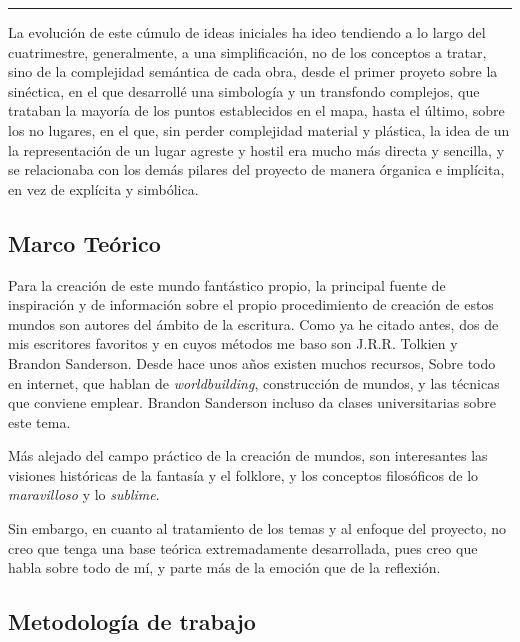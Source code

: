 \documentclass[twoside,twocolumn]{article}
\begin{document}
\begin{center}\rule{0.5\linewidth}{0.5pt}\end{center}

La evolución de este cúmulo de ideas iniciales ha ideo tendiendo a lo
largo del cuatrimestre, generalmente, a una simplificación, no de los
conceptos a tratar, sino de la complejidad semántica de cada obra, desde
el primer proyeto sobre la sinéctica, en el que desarrollé una
simbología y un transfondo complejos, que trataban la mayoría de los
puntos establecidos en el mapa, hasta el último, sobre los no lugares,
en el que, sin perder complejidad material y plástica, la idea de un la
representación de un lugar agreste y hostil era mucho más directa y
sencilla, y se relacionaba con los demás pilares del proyecto de manera
órganica e implícita, en vez de explícita y simbólica.

\hypertarget{marco-teuxf3rico}{%
\subsection{Marco Teórico}\label{marco-teuxf3rico}}

Para la creación de este mundo fantástico propio, la principal fuente de
inspiración y de información sobre el propio procedimiento de creación
de estos mundos son autores del ámbito de la escritura. Como ya he
citado antes, dos de mis escritores favoritos y en cuyos métodos me baso
son J.R.R. Tolkien y Brandon Sanderson. Desde hace unos años existen
muchos recursos, Sobre todo en internet, que hablan de
\emph{worldbuilding}, construcción de mundos, y las técnicas que
conviene emplear. Brandon Sanderson incluso da clases universitarias
sobre este tema.

Más alejado del campo práctico de la creación de mundos, son
interesantes las visiones históricas de la fantasía y el folklore, y los
conceptos filosóficos de lo \emph{maravilloso} y lo \emph{sublime}.

Sin embargo, en cuanto al tratamiento de los temas y al enfoque del
proyecto, no creo que tenga una base teórica extremadamente
desarrollada, pues creo que habla sobre todo de mí, y parte más de la
emoción que de la reflexión.

\hypertarget{metodologuxeda-de-trabajo}{%
\subsection{Metodología de trabajo}\label{metodologuxeda-de-trabajo}}
\end{document}
